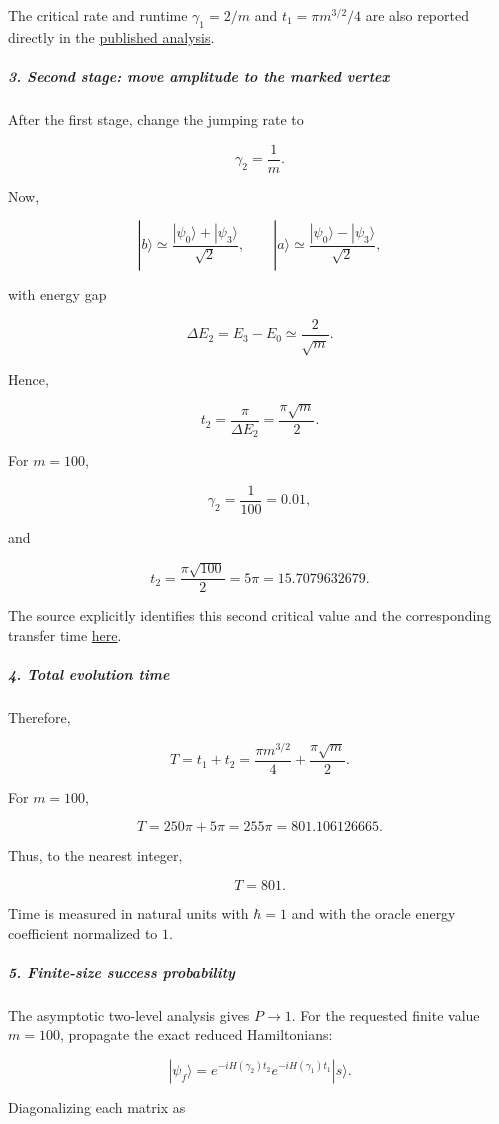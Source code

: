 The critical rate and runtime $\gamma_1=2/m$ and $t_1=\pi m^{3/2}/4$ are also reported directly in the \href{\detokenize{https://link.aps.org/accepted/10.1103/PhysRevLett.114.110503}}{published analysis}.

\subparagraph*{3. Second stage: move amplitude to the marked vertex}

After the first stage, change the jumping rate to

\[
\gamma_2=\frac{1}{m}.
\]

Now,

\[
|b\rangle\simeq \frac{|\psi_0\rangle+|\psi_3\rangle}{\sqrt2}, \qquad |a\rangle\simeq \frac{|\psi_0\rangle-|\psi_3\rangle}{\sqrt2},
\]

with energy gap

\[
\Delta E_2=E_3-E_0\simeq\frac{2}{\sqrt m}.
\]

Hence,

\[
t_2=\frac{\pi}{\Delta E_2} =\frac{\pi\sqrt m}{2}.
\]

For $m=100$,

\[
\gamma_2=\frac{1}{100}=0.01,
\]

and

\[
t_2=\frac{\pi\sqrt{100}}{2} =5\pi =15.7079632679.
\]

The source explicitly identifies this second critical value and the corresponding transfer time \href{\detokenize{https://link.aps.org/accepted/10.1103/PhysRevLett.114.110503}}{here}.

\subparagraph*{4. Total evolution time}

Therefore,

\[
T=t_1+t_2 = \frac{\pi m^{3/2}}{4} +\frac{\pi\sqrt m}{2}.
\]

For $m=100$,

\[
T=250\pi+5\pi =255\pi =801.106126665.
\]

Thus, to the nearest integer,

\[
T=801.
\]

Time is measured in natural units with $\hbar=1$ and with the oracle energy coefficient normalized to $1$.

\subparagraph*{5. Finite-size success probability}

The asymptotic two-level analysis gives $P\to1$. For the requested finite value $m=100$, propagate the exact reduced Hamiltonians:

\[
|\psi_f\rangle = e^{-iH(\gamma_2)t_2} e^{-iH(\gamma_1)t_1}|s\rangle.
\]

Diagonalizing each matrix as

